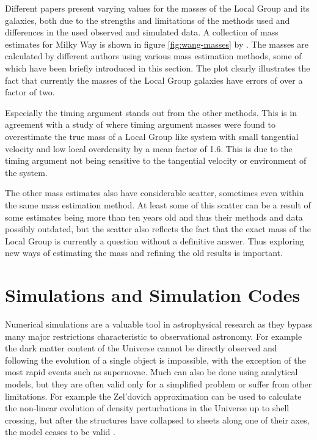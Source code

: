 \documentclass[english, oneside]{HYgradu}
\begin{document}
Different papers present varying values for the masses of the Local Group and its galaxies, both due to the strengths and limitations of the methods used and differences in the used observed and simulated data. A collection of mass estimates for Milky Way is shown in figure \ref{fig:wang-masses} by \citet{wang2015estimating}. The masses are calculated by different authors using various mass estimation methods, some of which have been briefly introduced in this section. The plot clearly illustrates the fact that currently the masses of the Local Group galaxies have errors of over a factor of two.

Especially the timing argument stands out from the other methods. This is in agreement with a study of \citet{gonzalez2014mass} where timing argument masses were found to overestimate the true mass of a Local Group like system with small tangential velocity and low local overdensity by a mean factor of 1.6. This is due to the timing argument not being sensitive to the tangential velocity or environment of the system.

The other mass estimates also have considerable scatter, sometimes even within the same mass estimation method. At least some of this scatter can be a result of some estimates being more than ten years old and thus their methods and data possibly outdated, but the scatter also reflects the fact that the exact mass of the Local Group is currently a question without a definitive answer. Thus exploring new ways of estimating the mass and refining the old results is important.



\chapter{Simulations and Simulation Codes}

Numerical simulations are a valuable tool in astrophysical research as they bypass many major restrictions characteristic to observational astronomy. For example the dark matter content of the Universe cannot be directly observed and following the evolution of a single object is impossible, with the exception of the most rapid events such as supernovae. Much can also be done using analytical models, but they are often valid only for a simplified problem or suffer from other limitations. For example the Zel'dovich approximation can be used to calculate the non-linear evolution of density perturbations in the Universe up to shell crossing, but after the structures have collapsed to sheets along one of their axes, the model ceases to be valid \citep{mo2010galaxy}.
\end{document}

